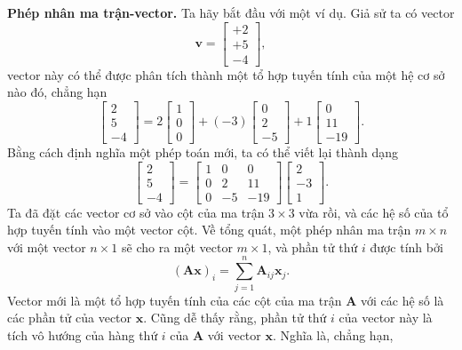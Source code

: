 \textbf{Phép nhân ma trận-vector.} Ta hãy bắt đầu với một ví dụ. Giả sử ta có vector \[\mathbf{v}=\begin{bmatrix}
    +2\\+5\\-4
\end{bmatrix},\] vector này có thể được phân tích thành một tổ hợp tuyến tính của một hệ cơ sở nào đó, chẳng hạn
\[\begin{bmatrix}
    2\\5\\-4
\end{bmatrix}=2\begin{bmatrix}
    1\\0\\0
\end{bmatrix}+(-3)\begin{bmatrix}
    0\\2\\-5
\end{bmatrix}+1\begin{bmatrix}
    0\\11\\-19
\end{bmatrix}.\]
Bằng cách định nghĩa một phép toán mới, ta có thể viết lại thành dạng
\begin{equation}\begin{bmatrix}
    2\\5\\-4
\end{bmatrix}=\begin{bmatrix}
    1&0&0\\
    0&2&11\\
    0&-5&-19
\end{bmatrix}\begin{bmatrix}
    2\\-3\\1
\end{bmatrix}.\end{equation}\label{eq2.2.1} Ta đã đặt các vector cơ sở vào cột của ma trận \(3\times 3\) vừa rồi, và các hệ số của tổ hợp tuyến tính vào một vector cột. Về tổng quát, một phép nhân ma trận \(m\times n\) với một vector \(n\times 1\) sẽ cho ra một vector \(m\times 1\), và phần tử thứ \(i\) được tính bởi 
\begin{equation}
    (\mathbf{Ax})_i = \sum_{j=1}^n \mathbf{A}_{ij}\mathbf{x}_j.
\end{equation}
Vector mới là một tổ hợp tuyến tính của các cột của ma trận \(\mathbf{A}\) với các hệ số là các phần tử của vector \(\mathbf{x}\). Cũng dễ thấy rằng, phần tử thứ \(i\) của vector này là tích vô hướng của hàng thứ \(i\) của \(\mathbf{A}\) với vector \(\mathbf{x}\). Nghĩa là, chẳng hạn, 
